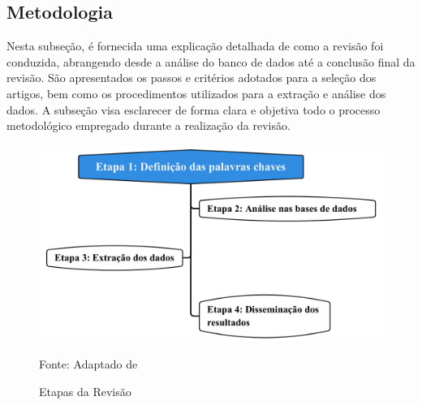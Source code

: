\subsection{Metodologia}\label{subsec:met da revisão}

Nesta subseção, é fornecida uma explicação detalhada de como a revisão foi conduzida, abrangendo desde a análise do banco de dados até a conclusão final da revisão. São apresentados os passos e critérios adotados para a seleção dos artigos, bem como os procedimentos utilizados para a extração e análise dos dados. A subseção visa esclarecer de forma clara e objetiva todo o processo metodológico empregado durante a realização da revisão.

\begin{figure}[H]
	\centering
	\caption{Etapas da Revisão}
	\label{fig:rsl}
	\includegraphics[width=0.9\linewidth]{Revisao/Figuras/RSL}
	
	Fonte: Adaptado de 
\end{figure}


